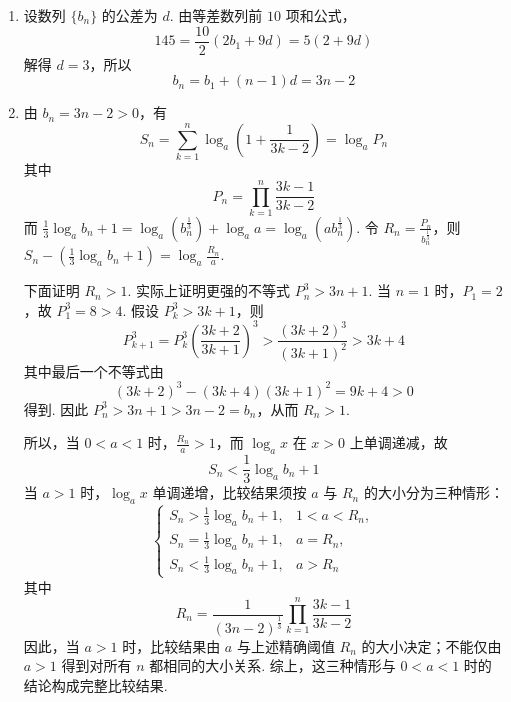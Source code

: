 \begin{solution}
\begin{enumerate}
\item 设数列 \(\{b_{n}\}\) 的公差为 \(d\). 由等差数列前 \(10\) 项和公式，
\[
145=\frac{10}{2}\left(2b_{1}+9d\right)=5(2+9d)
\]
解得 \(d=3\)，所以
\[
b_{n}=b_{1}+(n-1)d=3n-2
\]

\item 由 \(b_{n}=3n-2>0\)，有
\[
S_{n}=\sum_{k=1}^{n}\log_{a}\left(1+\frac{1}{3k-2}\right)=\log_{a}P_{n}
\]
其中
\[
P_{n}=\prod_{k=1}^{n}\frac{3k-1}{3k-2}
\]
而 \(\frac{1}{3}\log_{a}b_{n}+1=\log_{a}\left(b_{n}^{\frac{1}{3}}\right)+\log_{a}a=\log_{a}\left(ab_{n}^{\frac{1}{3}}\right)\). 令 \(R_{n}=\frac{P_{n}}{b_{n}^{\frac{1}{3}}}\)，则 \(S_{n}-\left(\frac{1}{3}\log_{a}b_{n}+1\right)=\log_{a}\frac{R_{n}}{a}\).

下面证明 \(R_{n}>1\). 实际上证明更强的不等式 \(P_{n}^{3}>3n+1\). 当 \(n=1\) 时，\(P_{1}=2\)，故 \(P_{1}^{3}=8>4\). 假设 \(P_{k}^{3}>3k+1\)，则
\[
P_{k+1}^{3}=P_{k}^{3}\left(\frac{3k+2}{3k+1}\right)^{3}>\frac{(3k+2)^{3}}{(3k+1)^{2}}>3k+4
\]
其中最后一个不等式由
\[
(3k+2)^{3}-(3k+4)(3k+1)^{2}=9k+4>0
\]
得到. 因此 \(P_{n}^{3}>3n+1>3n-2=b_{n}\)，从而 \(R_{n}>1\).

所以，当 \(0<a<1\) 时，\(\frac{R_{n}}{a}>1\)，而 \(\log_{a}x\) 在 \(x>0\) 上单调递减，故
\[
S_{n}<\frac{1}{3}\log_{a}b_{n}+1
\]
当 \(a>1\) 时，\(\log_{a}x\) 单调递增，比较结果须按 \(a\) 与 \(R_{n}\) 的大小分为三种情形：
\[
\begin{cases}
S_{n}>\frac{1}{3}\log_{a}b_{n}+1,&1<a<R_{n},\\
S_{n}=\frac{1}{3}\log_{a}b_{n}+1,&a=R_{n},\\
S_{n}<\frac{1}{3}\log_{a}b_{n}+1,&a>R_{n}
\end{cases}
\]
其中
\[
R_{n}=\frac{1}{(3n-2)^{\frac{1}{3}}}\prod_{k=1}^{n}\frac{3k-1}{3k-2}
\]
因此，当 \(a>1\) 时，比较结果由 \(a\) 与上述精确阈值 \(R_{n}\) 的大小决定；不能仅由 \(a>1\) 得到对所有 \(n\) 都相同的大小关系. 综上，这三种情形与 \(0<a<1\) 时的结论构成完整比较结果.
\end{enumerate}
\end{solution}
